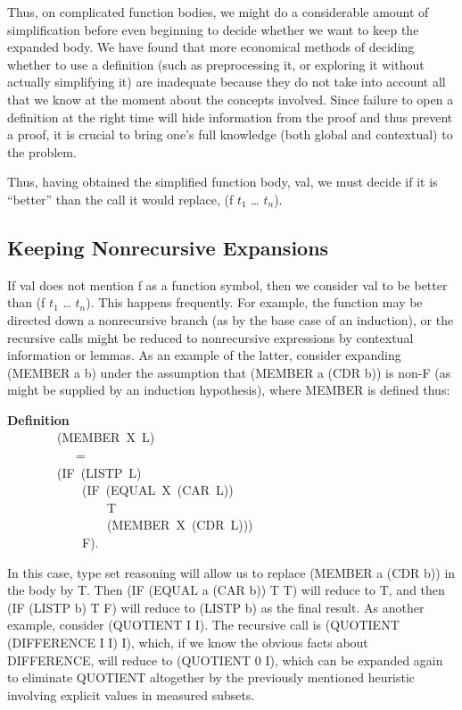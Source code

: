 \documentclass[10pt]{book}
\newenvironment{pubasis}{\begin{flushleft}}{\end{flushleft}}
\newcommand{\axiomordefinition}[1]{\vspace{6pt}\Large\textsf{\textbf{#1}}\normalsize}
\begin{document}
Thus, on complicated function bodies, we might do a considerable amount of
simplification before even beginning to decide whether we want to
keep the expanded body.
We have found that more economical methods of deciding whether to
use a definition (such as preprocessing it, or exploring it without
actually simplifying it) are  inadequate
because they do not take into account all that we know at the moment
about the concepts involved.  Since failure to open a definition at
the right time will hide information from the proof and thus prevent a
proof, it is crucial to bring one's full knowledge
(both global and contextual) to the problem.

Thus, having obtained the simplified function body, val, we must decide
if it is ``better'' than the call it would replace, (f $t_{1}$ \ldots{} $t_{n}$).

\subsection{Keeping Nonrecursive Expansions}
If val does not mention f as a function symbol, then we consider val to be
better than (f $t_{1}$ \ldots{} $t_{n}$).
This happens frequently.
For example, the function may be directed down a nonrecursive branch (as by
the base case of an induction), or the recursive calls might be reduced
to nonrecursive expressions by contextual information or lemmas.
As an example of the latter, consider expanding (MEMBER a b) 
under the assumption that (MEMBER a (CDR b)) is non-F (as might be
supplied by an induction hypothesis), where MEMBER is defined thus:
\begin{pubasis}
\axiomordefinition{Definition}\\
~~~~~~~~(MEMBER~X~L)\\
~~~~~~~~~~~=\\
~~~~~~~~(IF~(LISTP~L)\\
~~~~~~~~~~~~(IF~(EQUAL~X~(CAR~L))\\
~~~~~~~~~~~~~~~~T\\
~~~~~~~~~~~~~~~~(MEMBER~X~(CDR~L)))\\
~~~~~~~~~~~~F).\\
\end{pubasis}
In this case,
type set reasoning will allow us to replace (MEMBER a (CDR b)) in the
body by T.  Then (IF (EQUAL a (CAR b)) T T) will reduce to T, and then
(IF (LISTP b) T F) will reduce to (LISTP b) as the final result.
As another example,
consider (QUOTIENT I I).  The recursive call is (QUOTIENT (DIFFERENCE I I) I),
which, if we know the obvious facts about DIFFERENCE, will reduce to
(QUOTIENT 0 I), which can be expanded again to eliminate QUOTIENT altogether
by the previously mentioned heuristic involving explicit values in measured
subsets.
\end{document}
